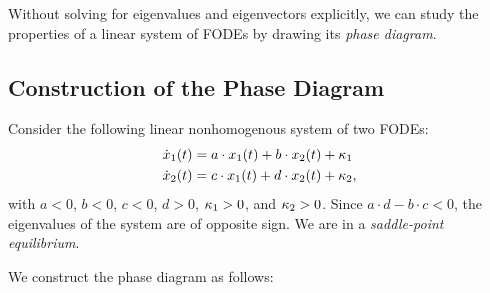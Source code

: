 \documentclass[letterpaper,12pt,leqno]{article}
\begin{document}
Without solving for eigenvalues and eigenvectors explicitly, we can study the properties of a linear system of FODEs by drawing its \textit{phase diagram}. 

\subsection{Construction of the Phase Diagram}

Consider the following linear nonhomogenous system of two FODEs:
\begin{align}
\dot{x}_{1}(t) &=a\cdot x_{1}(t)+b\cdot x_{2}(t)+\kappa_{1} \label{eq:nonh1}\\
\dot{x}_{2}(t) &=c\cdot x_{1}(t)+d\cdot x_{2}(t)+\kappa_{2},\label{eq:nonh2}
\end{align}
with $a<0$, $b<0$, $c<0$, $d>0$, $\kappa_{1}>0$, and $\kappa_{2}>0$. Since $a\cdot d-b\cdot c<0$, the eigenvalues of the system are of opposite sign. We are in a \textit{saddle-point equilibrium}.

We construct the phase diagram as follows:
\end{document}
